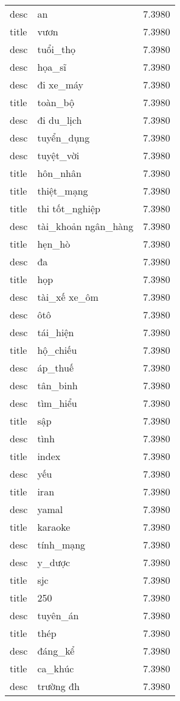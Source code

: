 \documentclass{article}
\begin{document}
\begin{tabular}{lll}
desc & an & 7.3980\\
title & vươn & 7.3980\\
desc & tuổi\_thọ & 7.3980\\
desc & họa\_sĩ & 7.3980\\
desc & đi xe\_máy & 7.3980\\
title & toàn\_bộ & 7.3980\\
desc & đi du\_lịch & 7.3980\\
desc & tuyển\_dụng & 7.3980\\
desc & tuyệt\_vời & 7.3980\\
title & hôn\_nhân & 7.3980\\
title & thiệt\_mạng & 7.3980\\
title & thi tốt\_nghiệp & 7.3980\\
desc & tài\_khoản ngân\_hàng & 7.3980\\
title & hẹn\_hò & 7.3980\\
desc & đa & 7.3980\\
title & họp & 7.3980\\
desc & tài\_xế xe\_ôm & 7.3980\\
desc & ôtô & 7.3980\\
desc & tái\_hiện & 7.3980\\
title & hộ\_chiếu & 7.3980\\
desc & áp\_thuế & 7.3980\\
desc & tân\_binh & 7.3980\\
desc & tìm\_hiểu & 7.3980\\
title & sập & 7.3980\\
desc & tình & 7.3980\\
title & index & 7.3980\\
desc & yếu & 7.3980\\
title & iran & 7.3980\\
desc & yamal & 7.3980\\
title & karaoke & 7.3980\\
desc & tính\_mạng & 7.3980\\
desc & y\_dược & 7.3980\\
title & sjc & 7.3980\\
title & 250 & 7.3980\\
desc & tuyên\_án & 7.3980\\
title & thép & 7.3980\\
desc & đáng\_kể & 7.3980\\
title & ca\_khúc & 7.3980\\
desc & trường đh & 7.3980\\

\end{tabular}
\end{document}
